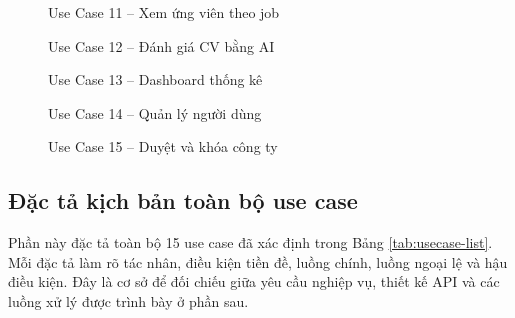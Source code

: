 \documentclass[../DoAn.tex]{subfiles}
\begin{document}
\begin{figure}[H]\centering{}\caption{Use Case 11 -- Xem ứng viên theo job}\label{fig:usecase-11}\end{figure}
\begin{figure}[H]\centering{}\caption{Use Case 12 -- Đánh giá CV bằng AI}\label{fig:usecase-12}\end{figure}
\begin{figure}[H]\centering{}\caption{Use Case 13 -- Dashboard thống kê}\label{fig:usecase-13}\end{figure}
\begin{figure}[H]\centering{}\caption{Use Case 14 -- Quản lý người dùng}\label{fig:usecase-14}\end{figure}
\begin{figure}[H]\centering{}\caption{Use Case 15 -- Duyệt và khóa công ty}\label{fig:usecase-15}\end{figure}

\subsection{Đặc tả kịch bản toàn bộ use case}

Phần này đặc tả toàn bộ 15 use case đã xác định trong Bảng \ref{tab:usecase-list}. Mỗi đặc tả làm rõ tác nhân, điều kiện tiền đề, luồng chính, luồng ngoại lệ và hậu điều kiện. Đây là cơ sở để đối chiếu giữa yêu cầu nghiệp vụ, thiết kế API và các luồng xử lý được trình bày ở phần sau.

\newcommand{\usecaseSpec}[7]{%
\begin{table}[H]
\centering
\renewcommand{\arraystretch}{1.12}
\begin{tabular}{|p{0.22\textwidth}|p{0.66\textwidth}|}
\hline
\textbf{Tên use case} & #1 \\
\hline
\textbf{Tác nhân chính} & #2 \\
\hline
\textbf{Tiền điều kiện} & #3 \\
\hline
\textbf{Luồng chính} & #4 \\
\hline
\textbf{Luồng ngoại lệ} & #5 \\
\hline
\textbf{Hậu điều kiện} & #6 \\
\hline
\end{tabular}
\caption{Đặc tả kịch bản Use Case: #1}
\label{#7}
\end{table}
}
\end{document}

